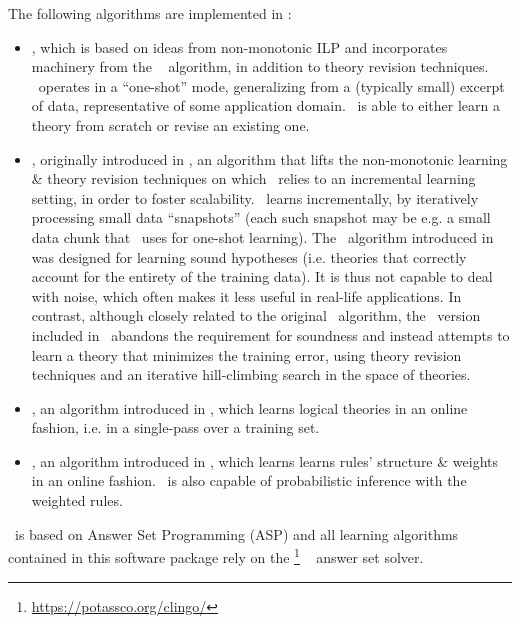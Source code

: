 \noindent The following algorithms are implemented in \trail:

\begin{itemize}
	\item \learnrev, which is based on ideas from non-monotonic ILP and incorporates machinery from the \xhail \ \cite{ray2009nonmonotonic} algorithm, in addition to theory revision techniques. \learnrev \ operates in a ``one-shot'' mode, generalizing from a (typically small) excerpt of data, representative of some application domain. \learnrev \ is able to either learn a theory from scratch or revise an existing one.
	
	\item \iled, originally introduced in \cite{katzouris2015incremental}, an algorithm that lifts the non-monotonic learning \& theory revision techniques on which \learnrev \ relies to an incremental learning setting, in order to foster scalability. \iled \ learns incrementally, by iteratively processing small data ``snapshots'' (each such snapshot may be e.g. a small data chunk that \learnrev \ uses for one-shot learning). The \iled \ algorithm introduced in \cite{katzouris2015incremental} was designed for learning sound hypotheses (i.e. theories that correctly account for the entirety of the training data). It is thus not capable to deal with noise, which often makes it less useful in real-life applications. In contrast, although closely related to the original \iled \ algorithm, the  \iled \ version  included in \trail \ abandons the requirement for soundness and instead attempts to learn a theory that minimizes the training error, using theory revision techniques and an iterative hill-climbing search in the space of theories. 
	\item \oled, an algorithm introduced in \cite{DBLP:journals/tplp/KatzourisAP16}, which learns logical theories in an online fashion, i.e. in a single-pass over a training set. 
	
	\item \woled, an algorithm introduced in \cite{kr2020}, which learns learns rules' structure \& weights in an online fashion. \woled \ is also capable of probabilistic inference with the weighted rules.     
\end{itemize} 

\noindent \trail \ is based on Answer Set Programming (ASP) \cite{lifschitz2019answer} and all learning algorithms contained in this software package rely on the \clingo\footnote{\url{https://potassco.org/clingo/}} \ \cite{gebser2015potassco} answer set solver. 

